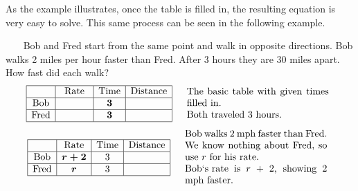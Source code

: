  As the example illustrates, once the table is filled in, the resulting equation is very easy to solve. This same process can be seen in the following example.%

\begin{example}\label{Lin87}~~~ Bob and Fred start from the same point and walk in opposite directions. Bob walks 2 miles per hour faster than Fred. After 3 hours they are 30 miles
  apart. How fast did each walk?
  \begin{eqnarray*}
    \begin{array}{|c|c|c|c|}
      \hline
      & \tmop{Rate} & \tmop{Time} & \tmop{Distance}\\
      \hline
      \tmop{Bob} & \mbox{\hspace{.4in}} & \tmmathbf{3} & \\
      \hline
      \tmop{Fred} &  & \tmmathbf{3} & \\
      \hline
    \end{array} &  & \begin{array}{p{0.425\textwidth}}
      \tmop{The} \tmop{basic} \tmop{table} \tmop{with} \tmop{given}
      \tmop{times} \tmop{filled} \tmop{in}.\\
			\tmop{Both} \tmop{traveled} 3 \tmop{hours}.
    \end{array}%
  \end{eqnarray*}
  \begin{eqnarray*}
    \begin{array}{|c|c|c|c|}
      \hline
      & \tmop{Rate} & \tmop{Time} & \tmop{Distance}\\
      \hline
      \tmop{Bob} & \tmmathbf{r + 2} & 3 & \\
      \hline
      \tmop{Fred} & \tmmathbf{r} & 3 & \\
      \hline
    \end{array} &  & \begin{array}{p{0.425\textwidth}}
      \tmop{Bob} \tmop{walks} 2 \tmop{mph} \tmop{faster} \tmop{than} \tmop{Fred}. \tmop{We} \tmop{know} \tmop{nothing} \tmop{about} \tmop{Fred}, \tmop{so} \tmop{use} $r$ \tmop{for} \tmop{his} \tmop{rate}.\\
      \tmop{Bob`s~rate} \tmop{is} $r~+$ 2, \tmop{showing} 2 \tmop{mph} \tmop{faster}.
    \end{array}\\
    &  & \\
    \begin{array}{|c|c|c|c|}

\end{array}
\end{eqnarray*}
\end{example}

